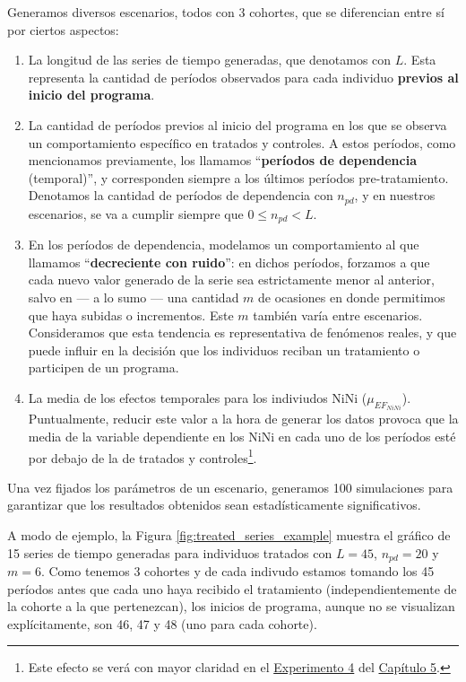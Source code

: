 \documentclass[../../main.tex]{subfiles}
\begin{document}
Generamos diversos escenarios, todos con 3 cohortes, que se diferencian entre sí por
ciertos aspectos:
\begin{enumerate}[itemsep=0.05cm, label=\textbf{\arabic*.}]
    \item La longitud de las series de tiempo generadas, que denotamos con \(L\). Esta
    representa la cantidad de períodos observados para cada individuo \textbf{previos al
    inicio del programa}.
    \item La cantidad de períodos previos al inicio del programa en los que se observa un
    comportamiento específico en tratados y controles. A estos períodos, como mencionamos
    previamente, los llamamos ``\textbf{períodos de dependencia} (temporal)'', y
    corresponden siempre a los últimos períodos pre-tratamiento. Denotamos la cantidad de
    períodos de dependencia con \(n_{pd}\), y en nuestros escenarios, se va a cumplir
    siempre que \(0 \le n_{pd} < L\).
    \item En los períodos de dependencia, modelamos un comportamiento al que llamamos
    ``\textbf{decreciente con ruido}'': en dichos períodos, forzamos a que cada nuevo
    valor generado de la serie sea estrictamente menor al anterior, salvo en — a lo sumo —
    una cantidad \(m\) de ocasiones en donde permitimos que haya subidas o incrementos.
    Este \(m\) también varía entre escenarios. Consideramos que esta tendencia es
    representativa de fenómenos reales, y que puede influir en la decisión que los
    individuos reciban un tratamiento o participen de un programa.
    \item La media de los efectos temporales para los indiviudos NiNi
    (\(\mu_{{EF}_{NiNi}}\)). Puntualmente, reducir este valor a la hora de generar los
    datos provoca que la media de la variable dependiente en los NiNi en cada uno de los
    períodos esté por debajo de la de tratados y controles\footnote{Este efecto se verá
    con mayor claridad en el \hyperref[sec:exp4]{Experimento 4} del
    \hyperref[chap:resultados]{Capítulo 5}.}.
\end{enumerate}
Una vez fijados los parámetros de un escenario, generamos 100 simulaciones para garantizar
que los resultados obtenidos sean estadísticamente significativos.

A modo de ejemplo, la Figura \ref{fig:treated_series_example} muestra el gráfico de 15
series de tiempo generadas para individuos tratados con \(L=45\), \(n_{pd}=20\) y \(m=6\).
Como tenemos 3 cohortes y de cada indivudo estamos tomando los 45 períodos antes que cada
uno haya recibido el tratamiento (independientemente de la cohorte a la que pertenezcan),
los inicios de programa, aunque no se visualizan explícitamente, son 46, 47 y 48 (uno para
cada cohorte).
\end{document}
